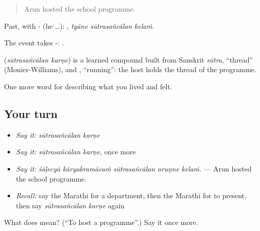 \begin{quote}
Arun hosted the school programme.
\end{quote}

Past, with - (he …):   , \emph{tyāne sūtrasañcālan kelaṁ}.

The event takes -:   .

\begin{cousinweb}
\textbf{ } (\emph{sūtrasañcālan karṇe}) is a learned compound built from Sanskrit \emph{sūtra}, \textquotedblleft{}thread\textquotedblright{} (Monier-Williams), and , \textquotedblleft{}running\textquotedblright{}: the host holds the thread of the programme.
\end{cousinweb}

\begin{grammarlens}[title={What you've built}]
One more word for describing what you lived and felt.
\end{grammarlens}

\subsection*{Your turn}
\begin{itemize}
\raggedright
  \item \emph{Say it:} \emph{sūtrasañcālan karṇe}
  \item \emph{Say it:} \emph{sūtrasañcālan karṇe}, once more
  \item \emph{Say it:} \emph{śāḷecyā kāryakramācaṁ sūtrasañcālan aruṇne kelaṁ.} — Arun hosted the school programme.
  \item \emph{Recall:} say the Marathi for a department, then the Marathi for to present, then say \emph{sūtrasañcālan karṇe} again
\end{itemize}

\begin{tcolorbox}[breakable,colback=teal!4,colframe=teal!35!black,title={Before you move on}]
What does   mean? (\textquotedblleft{}To host a programme\textquotedblright{}.) Say it once more.
\end{tcolorbox}
